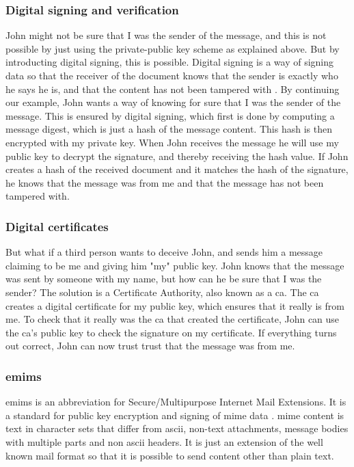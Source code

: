 \subsubsection{Digital signing and verification}
John might not be sure that I was the sender of the message, and this is not possible by just using the private-public key scheme as explained above. But by introducting digital signing, this is possible. Digital signing is a way of signing data so that the receiver of the document knows that the sender is exactly who he says he is, and that the content has not been tampered with \cite{bib:ds}. By continuing our example, John wants a way of knowing for sure that I was the sender of the message. This is ensured by digital signing, which first is done by computing a message digest, which is just a hash of the message content. This hash is then encrypted with my private key. When John receives the message he will use my public key to decrypt the signature, and thereby receiving the hash value. If John creates a hash of the received document and it matches the hash of the signature, he knows that the message was from me and that the message has not been tampered with. 

\subsubsection{Digital certificates}
But what if a third person wants to deceive John, and sends him a message claiming to be me and giving him "my" public key. John knows that the message was sent by someone with my name, but how can he be sure that I was the sender? The solution is a Certificate Authority, also known as a \gls{ca}. The \gls{ca} creates a digital certificate for my public key, which ensures that it really is from me. To check that it really was the \gls{ca} that created the certificate, John can use the \gls{ca}'s public key to check the signature on my certificate. If everything turns out correct, John can now trust trust that the message was from me.

\subsubsection{\gls{emims}}
\gls{emims} is an abbreviation for Secure/Multipurpose Internet Mail Extensions. It is a standard for public key encryption and signing of \gls{mime} data \cite{bib:smime}. \gls{mime} content is text in character sets that differ from \gls{ascii}, non-text attachments, message bodies with multiple parts and non \gls{ascii} headers. It is just an extension of the well known mail format so that it is possible to send content other than plain text.

